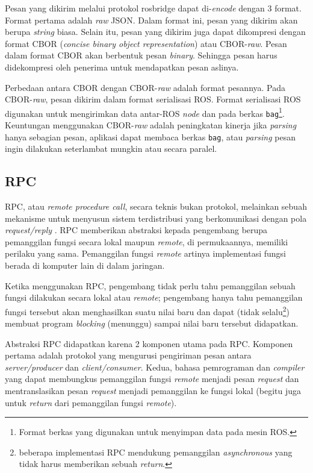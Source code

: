 Pesan yang dikirim melalui protokol rosbridge dapat di-\textit{encode} dengan 3
format. Format pertama adalah \textit{raw} JSON. Dalam format ini, pesan yang
dikirim akan berupa \textit{string} biasa. Selain itu, pesan yang dikirim juga
dapat dikompresi dengan format CBOR (\textit{concise binary object
      representation}) atau CBOR-\textit{raw}. Pesan dalam format CBOR akan berbentuk
pesan \textit{binary}. Sehingga pesan harus didekompresi oleh penerima untuk
mendapatkan pesan aslinya.

Perbedaan antara CBOR dengan CBOR-\textit{raw} adalah format pesannya. Pada
CBOR-\textit{raw}, pesan dikirim dalam format serialisasi ROS. Format
serialisasi ROS digunakan untuk mengirimkan data antar-ROS \textit{node} dan
pada berkas \texttt{bag}\footnote{Format berkas yang digunakan untuk menyimpan
      data pada mesin ROS.}. Keuntungan menggunakan CBOR-\textit{raw} adalah
peningkatan kinerja jika \textit{parsing} hanya sebagian pesan, aplikasi dapat
membaca berkas \texttt{bag}, atau \textit{parsing} pesan ingin dilakukan
seterlambat mungkin atau secara paralel.

\subsection{RPC}

RPC, atau \textit{remote procedure call}, secara teknis bukan protokol,
melainkan sebuah mekanisme untuk menyusun sistem terdistribusi yang
berkomunikasi dengan pola \textit{request/reply}
\parencite{larry_computerNetwork}. RPC memberikan abstraksi kepada pengembang
berupa pemanggilan fungsi secara lokal maupun \textit{remote}, di permukaannya,
memiliki perilaku yang sama. Pemanggilan fungsi \textit{remote} artinya
implementasi fungsi berada di komputer lain di dalam jaringan.

Ketika menggunakan RPC, pengembang tidak perlu tahu pemanggilan sebuah fungsi
dilakukan secara lokal atau \textit{remote}; pengembang hanya tahu pemanggilan
fungsi tersebut akan menghasilkan suatu nilai baru dan dapat (tidak
selalu\footnote{beberapa implementasi RPC mendukung pemanggilan
      \textit{asynchronous} yang tidak harus memberikan sebuah \textit{return}.})
membuat program \textit{blocking} (menunggu) sampai nilai baru tersebut
didapatkan.

Abstraksi RPC didapatkan karena 2 komponen utama pada RPC. Komponen pertama
adalah protokol yang mengurusi pengiriman pesan antara \textit{server/producer}
dan \textit{client/consumer}. Kedua, bahasa pemrograman dan \textit{compiler}
yang dapat membungkus pemanggilan fungsi \textit{remote} menjadi pesan
\textit{request} dan mentranslasikan pesan \textit{request} menjadi pemanggilan
ke fungsi lokal (begitu juga untuk \textit{return} dari pemanggilan fungsi
\textit{remote}).

